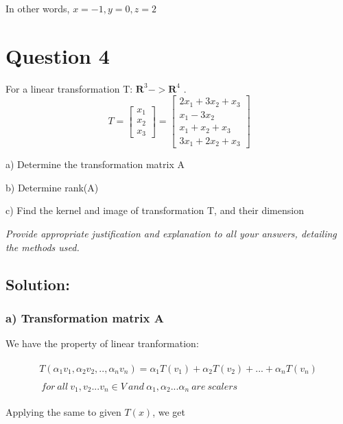 \documentclass[a4paper]{report}
\begin{document}
In other words, $x=-1, y=0, z=2$

\vspace{10mm}

\section*{Question 4}

For a linear transformation T: $\mathbf{R}^3 -> \mathbf{R}^4$ . 
\[\ T= \begin{bmatrix}
    x_1\\
    x_2\\
    x_3
\end{bmatrix} = \begin{bmatrix}
    2x_1+3x_2+x_3 \\
    x_1-3x_2 \\
    x_1+x_2+x_3 \\
    3x_1+2x_2+x_3
\end{bmatrix}\]

a) Determine the transformation matrix A 

b) Determine rank(A) 

c) Find the kernel and image of transformation T, and their dimension 

\textit{Provide appropriate justification and explanation to all your answers, detailing the methods used.}

\subsection*{Solution:}

\subsubsection*{a) Transformation matrix A}


We have the property of linear tranformation:

\begin{align*}
\begin{split}
        T(\alpha_1v_1,\alpha_2v_2,..,\alpha_nv_n) = \alpha_1T(v_1)+\alpha_2T(v_2)+...+\alpha_nT(v_n)
\end{split}\\
\begin{split}
    \ for\ all\ v_1,v_2...v_n\in V\ and\ \alpha_1,\alpha_2...\alpha_n\ are\ scalers
\end{split}
\end{align*}

Applying the same to given $T(x)$, we get
\end{document}
